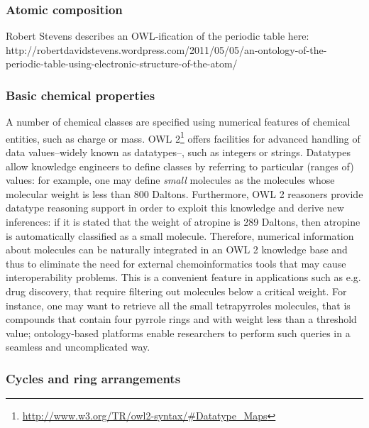 \documentclass[10pt]{bmc_article}
\newenvironment{bmcformat}{\baselineskip20pt\sloppy\setboolean{publ}{false}}{\baselineskip20pt\sloppy}
\begin{document}
\begin{bmcformat}
\subsubsection*{Atomic composition}

Robert Stevens describes an OWL-ification of the periodic table here: http://robertdavidstevens.wordpress.com/2011/05/05/an-ontology-of-the-periodic-table-using-electronic-structure-of-the-atom/

\subsubsection*{Basic chemical properties}

A number of chemical classes are specified using numerical features of chemical entities, such as charge or mass. OWL 2\footnote{\url{http://www.w3.org/TR/owl2-syntax/#Datatype_Maps}} offers facilities for advanced handling of data values--widely known as datatypes--, such as integers or strings. Datatypes allow knowledge engineers to define classes by referring to particular (ranges of) values: for example, one may define \emph{small} molecules as the molecules whose molecular weight is less than 800 Daltons. Furthermore, OWL 2 reasoners provide datatype reasoning support\cite{Motik2008} in order to exploit this knowledge and derive new inferences: if it is stated that the weight of atropine is 289 Daltons, then atropine is automatically classified as a small molecule. Therefore, numerical information about molecules can be naturally integrated in an OWL 2 knowledge base and thus to eliminate the need for external chemoinformatics tools that may cause interoperability problems. This is a convenient feature in applications such as e.g. drug discovery, that require filtering out molecules below a critical weight. For instance, one may want to retrieve all the small tetrapyrroles molecules, that is compounds that contain four pyrrole rings and with weight less than a threshold value; ontology-based platforms enable researchers to perform such queries in a seamless and uncomplicated way.

\subsubsection*{Cycles and ring arrangements}
\label{subsubsec:cycles}


\end{bmcformat}
\end{document}
